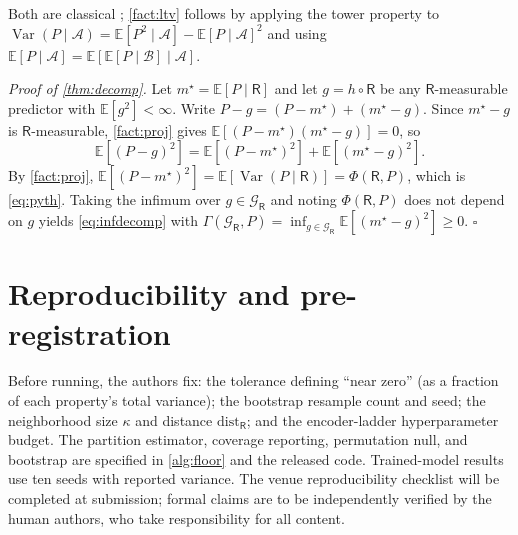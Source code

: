 \documentclass[10pt]{article}
\newcommand{\E}{\mathbb{E}}
\newcommand{\Var}{\operatorname{Var}}
\newcommand{\R}{\mathsf{R}}
\newcommand{\Gcal}{\mathcal{G}}
\begin{document}
Both are classical \citep{hastie2009esl,devroye1996probabilistic,cover2006information}; \cref{fact:ltv} follows by applying the tower property to $\Var(P\mid\mathcal{A})=\E[P^2\mid\mathcal{A}]-\E[P\mid\mathcal{A}]^2$ and using $\E[P\mid\mathcal{A}]=\E[\E[P\mid\mathcal{B}]\mid\mathcal{A}]$.

\medskip
\noindent\textit{Proof of \cref{thm:decomp}.} Let $m^\star=\E[P\mid\R]$ and let $g=h\circ\R$ be any $\R$-measurable predictor with $\E[g^2]<\infty$. Write $P-g=(P-m^\star)+(m^\star-g)$. Since $m^\star-g$ is $\R$-measurable, \cref{fact:proj} gives $\E[(P-m^\star)(m^\star-g)]=0$, so
\[
\E[(P-g)^2] = \E[(P-m^\star)^2] + \E[(m^\star-g)^2].
\]
By \cref{fact:proj}, $\E[(P-m^\star)^2]=\E[\Var(P\mid\R)]=\Phi(\R,P)$, which is \cref{eq:pyth}. Taking the infimum over $g\in\Gcal_\R$ and noting $\Phi(\R,P)$ does not depend on $g$ yields \cref{eq:infdecomp} with $\Gamma(\Gcal_\R,P)=\inf_{g\in\Gcal_\R}\E[(m^\star-g)^2]\ge0$. \hfill$\square$

\section{Reproducibility and pre-registration}
\label{app:repro}
Before running, the authors fix: the tolerance defining ``near zero'' (as a fraction of each property's total variance); the bootstrap resample count and seed; the neighborhood size $\kappa$ and distance $\mathrm{dist}_\R$; and the encoder-ladder hyperparameter budget. The partition estimator, coverage reporting, permutation null, and bootstrap are specified in \cref{alg:floor} and the released code. Trained-model results use ten seeds with reported variance. The venue reproducibility checklist will be completed at submission; formal claims are to be independently verified by the human authors, who take responsibility for all content.
\end{document}
